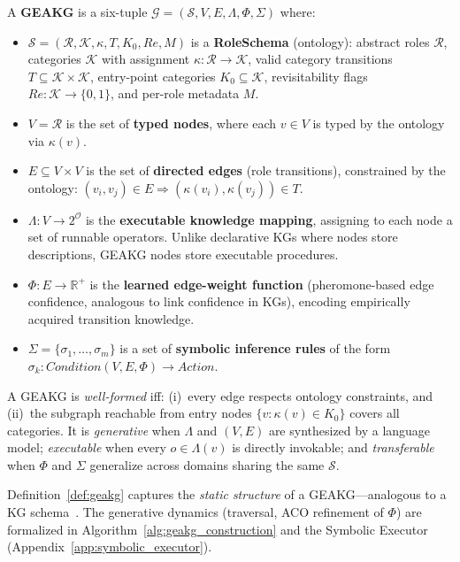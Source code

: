 
\begin{definition}
\label{def:geakg}
A \textbf{GEAKG} is a six-tuple $\mathcal{G} = (\mathcal{S}, V, E, \Lambda, \Phi, \Sigma)$ where:
\begin{itemize}
    \item $\mathcal{S} = (\mathcal{R}, \mathcal{K}, \kappa, T, K_0, \textit{Re}, M)$ is a \textbf{RoleSchema} (ontology): abstract roles $\mathcal{R}$, categories $\mathcal{K}$ with assignment $\kappa: \mathcal{R} \to \mathcal{K}$, valid category transitions $T \subseteq \mathcal{K} \times \mathcal{K}$, entry-point categories $K_0 \subseteq \mathcal{K}$, revisitability flags $\textit{Re}: \mathcal{K} \to \{0,1\}$, and per-role metadata $M$.
    \item $V = \mathcal{R}$ is the set of \textbf{typed nodes}, where each $v \in V$ is typed by the ontology via $\kappa(v)$.
    \item $E \subseteq V \times V$ is the set of \textbf{directed edges} (role transitions), constrained by the ontology: $(v_i, v_j) \in E \Rightarrow (\kappa(v_i), \kappa(v_j)) \in T$.
    \item $\Lambda: V \to 2^{\mathcal{O}}$ is the \textbf{executable knowledge mapping}, assigning to each node a set of runnable operators. Unlike declarative KGs where nodes store descriptions, GEAKG nodes store executable procedures.
    \item $\Phi: E \to \mathbb{R}^+$ is the \textbf{learned edge-weight function} (pheromone-based edge confidence, analogous to link confidence in KGs), encoding empirically acquired transition knowledge.
    \item $\Sigma = \{\sigma_1, \ldots, \sigma_m\}$ is a set of \textbf{symbolic inference rules} of the form $\sigma_k: \textit{Condition}(V, E, \Phi) \to \textit{Action}$.
\end{itemize}
A GEAKG is \emph{well-formed} iff: (i)~every edge respects ontology constraints, and (ii)~the subgraph reachable from entry nodes $\{v : \kappa(v) \in K_0\}$ covers all categories. It is \emph{generative} when $\Lambda$ and $(V, E)$ are synthesized by a language model; \emph{executable} when every $o \in \Lambda(v)$ is directly invokable; and \emph{transferable} when $\Phi$ and $\Sigma$ generalize across domains sharing the same $\mathcal{S}$.
\end{definition}

Definition~\ref{def:geakg} captures the \emph{static structure} of a GEAKG---analogous to a KG schema~\cite{hogan2021knowledge}. The generative dynamics (traversal, ACO refinement of $\Phi$) are formalized in Algorithm~\ref{alg:geakg_construction} and the Symbolic Executor (Appendix~\ref{app:symbolic_executor}).

